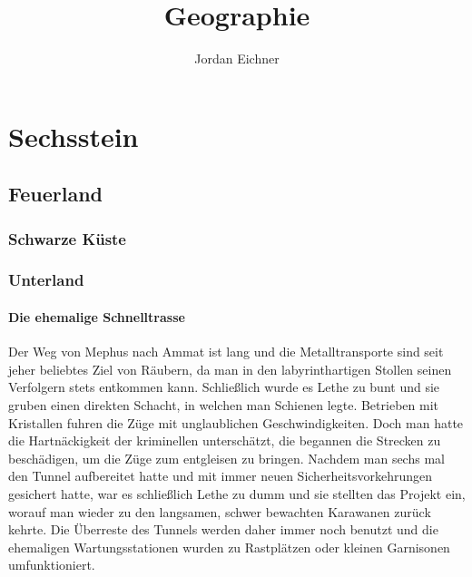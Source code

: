 \documentclass[a4paper,12pt,oneside]{book}
\title{Geographie}
\author{Jordan Eichner}
\date{}
\begin{document}
\maketitle
\tableofcontents

\part{Sechsstein}

\chapter{Feuerland}

\section{Schwarze Küste}

\section{Unterland}

\subsection{Die ehemalige Schnelltrasse}
Der Weg von Mephus nach Ammat ist lang und die Metalltransporte sind seit jeher beliebtes Ziel von Räubern, da man in den labyrinthartigen Stollen seinen Verfolgern stets entkommen kann. Schließlich wurde es Lethe zu bunt und sie gruben einen direkten Schacht, in welchen man Schienen legte. Betrieben mit Kristallen fuhren die Züge mit unglaublichen Geschwindigkeiten. Doch man hatte die Hartnäckigkeit der kriminellen unterschätzt, die begannen die Strecken zu beschädigen, um die Züge zum entgleisen zu bringen. Nachdem man sechs mal den Tunnel aufbereitet hatte und mit immer neuen Sicherheitsvorkehrungen gesichert hatte, war es schließlich Lethe zu dumm und sie stellten das Projekt ein, worauf man wieder zu den langsamen, schwer bewachten Karawanen zurück kehrte. Die Überreste des Tunnels werden daher immer noch benutzt und die ehemaligen Wartungsstationen wurden zu Rastplätzen oder kleinen Garnisonen umfunktioniert.
\end{document}
